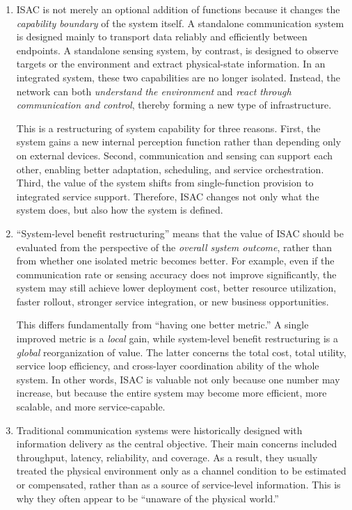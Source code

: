 \begin{enumerate}[label=\textbf{\arabic*.}, leftmargin=*]

    \item 
    ISAC is not merely an optional addition of functions because it changes the \emph{capability boundary} of the system itself. A standalone communication system is designed mainly to transport data reliably and efficiently between endpoints. A standalone sensing system, by contrast, is designed to observe targets or the environment and extract physical-state information. In an integrated system, these two capabilities are no longer isolated. Instead, the network can both \emph{understand the environment} and \emph{react through communication and control}, thereby forming a new type of infrastructure.

    This is a restructuring of system capability for three reasons. First, the system gains a new internal perception function rather than depending only on external devices. Second, communication and sensing can support each other, enabling better adaptation, scheduling, and service orchestration. Third, the value of the system shifts from single-function provision to integrated service support. Therefore, ISAC changes not only what the system does, but also how the system is defined.

    \item 
    ``System-level benefit restructuring'' means that the value of ISAC should be evaluated from the perspective of the \emph{overall system outcome}, rather than from whether one isolated metric becomes better. For example, even if the communication rate or sensing accuracy does not improve significantly, the system may still achieve lower deployment cost, better resource utilization, faster rollout, stronger service integration, or new business opportunities.

    This differs fundamentally from ``having one better metric.'' A single improved metric is a \emph{local} gain, while system-level benefit restructuring is a \emph{global} reorganization of value. The latter concerns the total cost, total utility, service loop efficiency, and cross-layer coordination ability of the whole system. In other words, ISAC is valuable not only because one number may increase, but because the entire system may become more efficient, more scalable, and more service-capable.

    \item 
    Traditional communication systems were historically designed with information delivery as the central objective. Their main concerns included throughput, latency, reliability, and coverage. As a result, they usually treated the physical environment only as a channel condition to be estimated or compensated, rather than as a source of service-level information. This is why they often appear to be ``unaware of the physical world.''


\end{enumerate}
